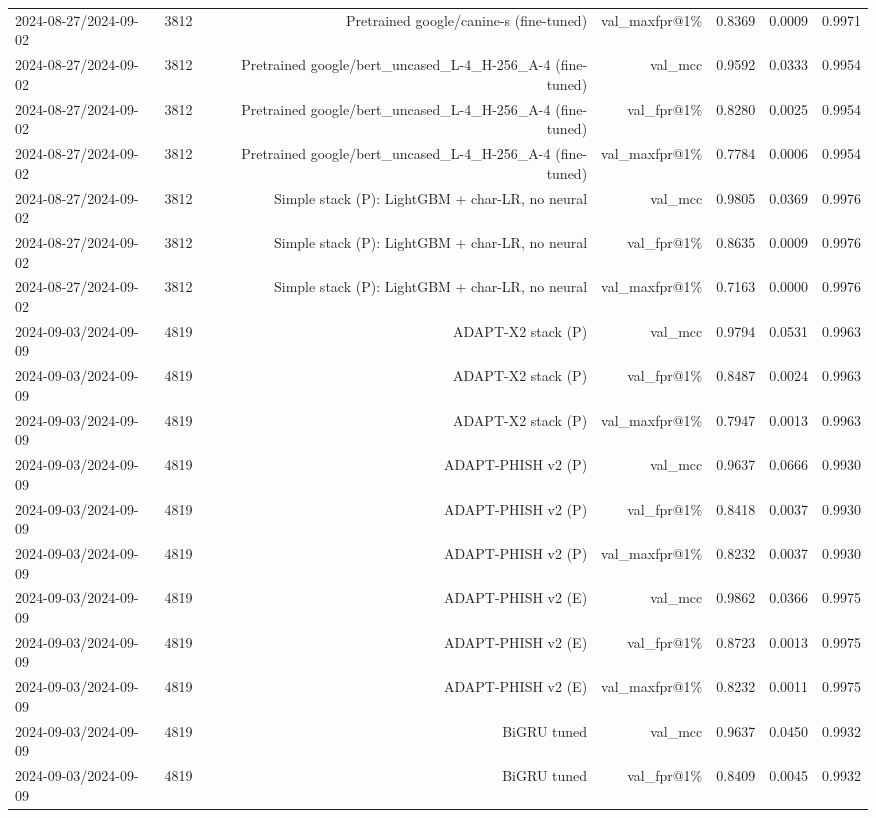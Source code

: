 \begin{table}[t]
\begin{tabular}{llrrrrr}
2024-08-27/2024-09-02 & 3812 & Pretrained google/canine-s (fine-tuned) & val\_maxfpr@1\% & 0.8369 & 0.0009 & 0.9971 \\
2024-08-27/2024-09-02 & 3812 & Pretrained google/bert\_uncased\_L-4\_H-256\_A-4 (fine-tuned) & val\_mcc & 0.9592 & 0.0333 & 0.9954 \\
2024-08-27/2024-09-02 & 3812 & Pretrained google/bert\_uncased\_L-4\_H-256\_A-4 (fine-tuned) & val\_fpr@1\% & 0.8280 & 0.0025 & 0.9954 \\
2024-08-27/2024-09-02 & 3812 & Pretrained google/bert\_uncased\_L-4\_H-256\_A-4 (fine-tuned) & val\_maxfpr@1\% & 0.7784 & 0.0006 & 0.9954 \\
2024-08-27/2024-09-02 & 3812 & Simple stack (P): LightGBM + char-LR, no neural & val\_mcc & 0.9805 & 0.0369 & 0.9976 \\
2024-08-27/2024-09-02 & 3812 & Simple stack (P): LightGBM + char-LR, no neural & val\_fpr@1\% & 0.8635 & 0.0009 & 0.9976 \\
2024-08-27/2024-09-02 & 3812 & Simple stack (P): LightGBM + char-LR, no neural & val\_maxfpr@1\% & 0.7163 & 0.0000 & 0.9976 \\
2024-09-03/2024-09-09 & 4819 & ADAPT-X2 stack (P) & val\_mcc & 0.9794 & 0.0531 & 0.9963 \\
2024-09-03/2024-09-09 & 4819 & ADAPT-X2 stack (P) & val\_fpr@1\% & 0.8487 & 0.0024 & 0.9963 \\
2024-09-03/2024-09-09 & 4819 & ADAPT-X2 stack (P) & val\_maxfpr@1\% & 0.7947 & 0.0013 & 0.9963 \\
2024-09-03/2024-09-09 & 4819 & ADAPT-PHISH v2 (P) & val\_mcc & 0.9637 & 0.0666 & 0.9930 \\
2024-09-03/2024-09-09 & 4819 & ADAPT-PHISH v2 (P) & val\_fpr@1\% & 0.8418 & 0.0037 & 0.9930 \\
2024-09-03/2024-09-09 & 4819 & ADAPT-PHISH v2 (P) & val\_maxfpr@1\% & 0.8232 & 0.0037 & 0.9930 \\
2024-09-03/2024-09-09 & 4819 & ADAPT-PHISH v2 (E) & val\_mcc & 0.9862 & 0.0366 & 0.9975 \\
2024-09-03/2024-09-09 & 4819 & ADAPT-PHISH v2 (E) & val\_fpr@1\% & 0.8723 & 0.0013 & 0.9975 \\
2024-09-03/2024-09-09 & 4819 & ADAPT-PHISH v2 (E) & val\_maxfpr@1\% & 0.8232 & 0.0011 & 0.9975 \\
2024-09-03/2024-09-09 & 4819 & BiGRU tuned & val\_mcc & 0.9637 & 0.0450 & 0.9932 \\
2024-09-03/2024-09-09 & 4819 & BiGRU tuned & val\_fpr@1\% & 0.8409 & 0.0045 & 0.9932 \\

\end{tabular}
\end{table}
